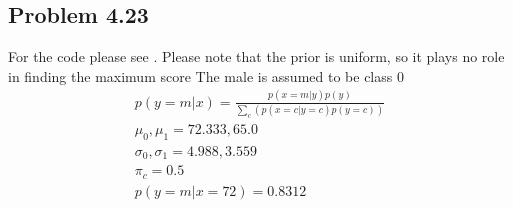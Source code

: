 \subsection{Problem 4.23}
For the code please see \cite{CS3390}.
Please note that the prior is uniform, so it plays no role in finding the maximum score
The male is assumed to be class 0 
\begin{gather}
    p(y = m | x) = \frac{p(x = m | y)p(y)}{\sum_c ( p ( x = c | y  = c)p(y =c))}
    \\
    \mu_0 , \mu_1 = 72.333, 65.0
    \\
    \sigma_0 , \sigma_1  = 4.988, 3.559
    \\
    \pi_c = 0.5
    \\
    p(y  = m | x = 72) = 0.8312
\end{gather}

